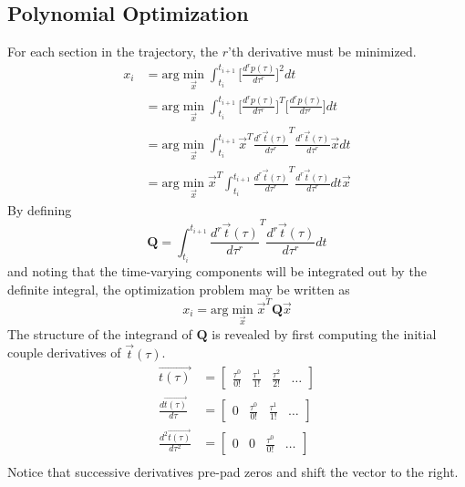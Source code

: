 \documentclass[12pt]{article}
\begin{document}
\subsection{Polynomial Optimization}
For each section in the trajectory, the $r$'th derivative must be minimized.
\begin{align*}
    x_{i} &= \text{arg} \min_{\vec{x}} \int_{t_{i}}^{t_{i+1}} \bigg[ \frac{d^{r}
    p(\tau)}{d \tau^{r}} \bigg]^2 dt \\
        &= \text{arg} \min_{\vec{x}} \int_{t_{i}}^{t_{i+1}} \bigg[ \frac{d^{r}
    p(\tau)}{d \tau^{r}}\bigg]^T \bigg[ \frac{d^{r} p(\tau)}{d \tau^{r}}\bigg]
    dt \\
        &= \text{arg} \min_{\vec{x}} \int_{t_{i}}^{t_{i+1}} \vec{x}^T \frac{d^{r}
    \vec{t}(\tau)}{d \tau^{r}}^{T} \frac{d^{r} \vec{t}(\tau)}{d \tau^{r}}
    \vec{x} dt \\
        &= \text{arg} \min_{\vec{x}} \vec{x}^{T} \int_{t_{i}}^{t_{i+1}} \frac{d^{r}
    \vec{t}(\tau)}{d \tau^{r}}^{T} \frac{d^{r} \vec{t}(\tau)}{d \tau^{r}} dt
    \vec{x}
\end{align*}
%
By defining
\begin{equation*}
  \mathbf{Q} = \int_{t_{i}}^{t_{i+1}} \frac{d^{r} \vec{t}(\tau)}{d
  \tau^{r}}^{T} \frac{d^{r} \vec{t}(\tau)}{d \tau^{r}} dt
\end{equation*}
%
and noting that the time-varying components will be integrated out by the
definite integral, the optimization problem may be written as
\begin{equation*}
  x_{i} = \text{arg} \min_{\vec{x}} \vec{x}^{T} \mathbf{Q} \vec{x}
\end{equation*}
%
The structure of the integrand of $\mathbf{Q}$ is revealed by first computing the initial couple
derivatives of $\vec{t}(\tau)$.
\begin{align*}
  \vec{t(\tau)} &= 
  \begin{bmatrix}
    \frac{\tau^{0}}{0!} & \frac{\tau^{1}}{1!} & \frac{\tau^{2}}{2!} & \hdots
  \end{bmatrix} \\
  \frac{d \vec{t(\tau)}}{d\tau} &= 
  \begin{bmatrix}
    0 & \frac{\tau^{0}}{0!} & \frac{\tau^{1}}{1!} & \hdots
  \end{bmatrix} \\
  \frac{d^{2} \vec{t(\tau)}}{d\tau^{2}} &= 
  \begin{bmatrix}
    0 & 0 & \frac{\tau^{0}}{0!} & \hdots
  \end{bmatrix} \\
\end{align*}
%
Notice that successive derivatives pre-pad zeros and shift the vector
to the right. 
\end{document}
